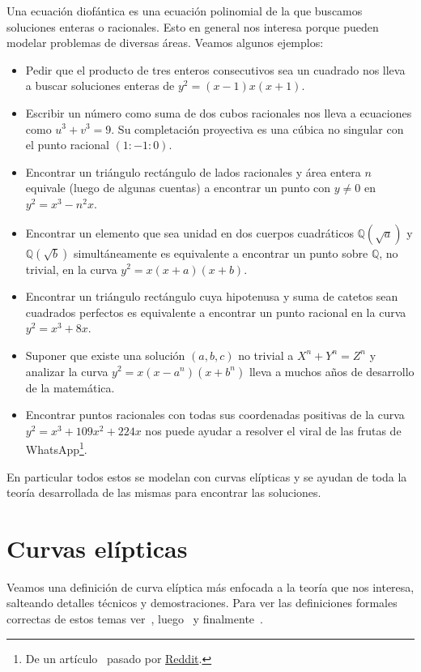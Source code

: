 \documentclass[a4paper]{book}
\theoremstyle{definition}
\theoremstyle{plain}
\newcommand{\QQ}{\mathbb{Q}}
\begin{document}
Una ecuación diofántica es una ecuación polinomial de la que buscamos soluciones enteras o racionales. Esto en general nos interesa porque pueden modelar problemas de diversas áreas. Veamos algunos ejemplos:
\begin{itemize}
    \item Pedir que el producto de tres enteros consecutivos sea un cuadrado nos lleva a buscar soluciones enteras de $y^2=(x-1)x(x+1)$.
    \item Escribir un número como suma de dos cubos racionales nos lleva a ecuaciones como $u^3+v^3=9$. Su completación proyectiva es una cúbica no singular con el punto racional $(1:-1:0)$.
    \item Encontrar un triángulo rectángulo de lados racionales y área entera $n$ equivale (luego de algunas cuentas) a encontrar un punto con $y\neq0$ en $y^2=x^3-n^2x$.
    \item Encontrar un elemento que sea unidad en dos cuerpos cuadráticos $\QQ(\sqrt{a})$ y $\QQ(\sqrt{b})$ simultáneamente es equivalente a encontrar un punto sobre $\QQ$, no trivial, en la curva $y^2 = x(x+a)(x+b)$.
    \item Encontrar un triángulo rectángulo cuya hipotenusa y suma de catetos sean cuadrados perfectos es equivalente a encontrar un punto racional en la curva $y^2=x^3+8x$.
    \item Suponer que existe una solución $(a,b,c)$ no trivial a $X^n + Y^n = Z^n$ y analizar la curva $y^2=x(x-a^n)(x+b^n)$ lleva a muchos años de desarrollo de la matemática.
    \item Encontrar puntos racionales con todas sus coordenadas positivas de la curva $y^2 = x^3+109x^2+224x$ nos puede ayudar a resolver el viral de las frutas de WhatsApp\footnote{De un artículo~\cite{BremnerMacleod2014Cubic} pasado por \href{https://www.reddit.com/r/math/s/h6zQjUBwDf}{Reddit}.}.
\end{itemize}

En particular todos estos se modelan con curvas elípticas y se ayudan de toda la teoría desarrollada de las mismas para encontrar las soluciones.

\section{Curvas elípticas}

Veamos una definición de curva elíptica más enfocada a la teoría que nos interesa, salteando detalles técnicos y demostraciones. Para ver las definiciones formales correctas de estos temas ver~\cite{SilvermanTate}, luego~\cite{SilvermanAEC} y finalmente~\cite{SilvermanAdvanced}.
\end{document}
